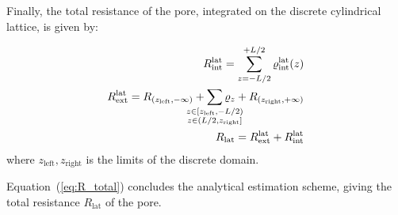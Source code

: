 \documentclass[10pt, a4paper]{article}
\begin{document}
\begin{multicols}{2}
Finally, the total resistance of the pore, integrated on the discrete cylindrical lattice, is given by:

\begin{eqnarray}
    R_{\text{int}}^{\text{lat}} = \sum_{z=-L/2}^{+L/2} \varrho_{\text{int}}^{\text{lat}}(z)
    \\
    R_{\text{ext}}^{\text{lat}} = R_{(z_{\text{left}}, -\infty)} + \sum\limits_{\mathclap{\substack{z \in [z_{\text{left}},-L/2)\\z \in (L/2, z_\text{right}]}}} \varrho_{z} + R_{(z_{\text{right}}, +\infty)}
    \\
    \label{eq:R_total}
    R_{\text{lat}} = R_{\text{ext}}^{\text{lat}} + R_{\text{int}}^{\text{lat}}
\end{eqnarray}
where $z_{\text{left}}, z_{\text{right}}$ is the limits of the discrete domain.

Equation~(\ref{eq:R_total}) concludes the analytical estimation scheme, giving the total resistance $R_{\text{lat}}$ of the pore.

\end{multicols}
\end{document}
